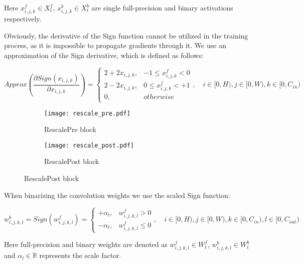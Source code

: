 \documentclass{article}
\begin{document}
Here $x_{i, j, k}^f \in X_t^f$, $x_{i, j, k}^b \in X_t^b$ are single full-precision and binary activations respectively.

Obviously, the derivative of the Sign function cannot be utilized in the training process, as it is impossible to propagate gradients through it. We use an approximation of the Sign derivative, which is defined as follows:

\begin{equation}
    Approx\left(\dfrac{\partial Sign(x_{i, j, k})}{\partial x_{i, j, k}}\right) = 
    \begin{cases}
        2 + 2x_{i, j, k}, & - 1 \le x_{i, j, k}^f < 0 \\
        2 - 2x_{i, j, k}, & 0 \le x_{i, j, k}^f < +1 \\
        0, & otherwise
    \end{cases}, \quad
    i \in [0, H), j \in [0, W), k \in [0, C_{in})
\label{eq_act_sign_der}
\end{equation}

\begin{figure}[t]
\centering
\begin{subfigure}[b]{0.8\textwidth}
   \texttt{[image: rescale\_pre.pdf]}
   \caption{RescalePre block}
   \label{block:c} 
\end{subfigure}

\begin{subfigure}[b]{0.8\textwidth}
   \texttt{[image: rescale\_post.pdf]}
   \caption{RescalePost block}
   \label{block:d} 
\end{subfigure}
\end{figure}

When binarizing the convolution weights we use the scaled Sign function:

\begin{equation}
    w_{i, j, k, l}^b = Sign(w_{i, j, k, l}^f) = 
    \begin{cases}
        +\alpha_l, & w_{i, j, k, l}^f > 0 \\
        -\alpha_l, & w_{i, j, k, l}^f \le 0
    \end{cases}, \quad
    i \in [0, H), j \in [0, W), k \in [0, C_{in}), l \in [0, C_{out})
\end{equation}

Here full-precision and binary weights are denoted as $w_{i, j, k, l}^f \in W_t^f$, $w_{i, j, k, l}^b \in W_t^b$ and $\alpha_l \in \mathbb{R}$ represents the scale factor.
\end{document}
